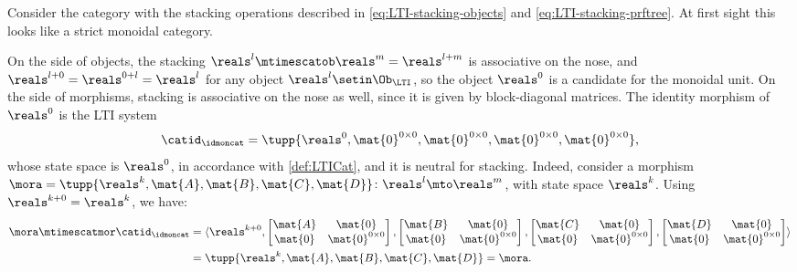 \begin{example}
    \label{exa:LTI-stacking-not-functorial}
    Consider the category \LTI with the stacking operations described in \cref{eq:LTI-stacking-objects} and \cref{eq:LTI-stacking-prftree}.
    At first sight this looks like a strict monoidal category.

    On the side of objects, the stacking $\reals^l \mtimescatob \reals^m = \reals^{l+m}$ is associative on the nose, and $\reals^{l+0}=\reals^{0+l}=\reals^l$ for any object $\reals^l\setin \Ob_\LTI$, so the object $\reals^0$ is a candidate for the monoidal unit.
    On the side of morphisms, stacking is associative on the nose as well, since it is given by block-diagonal matrices.
    The identity morphism of $\reals^0$ is the LTI system
    \begin{equation*}
        \catid_\idmoncat=\tupp{\reals^0, \mat{0}^{0\times 0}, \mat{0}^{0\times 0}, \mat{0}^{0\times 0},\mat{0}^{0\times 0}},
    \end{equation*}
    whose state space is $\reals^0$, in accordance with \cref{def:LTICat}, and it is neutral for stacking.
    Indeed, consider a morphism $\mora = \tupp{\reals^k, \mat{A}, \mat{B}, \mat{C}, \mat{D}} \colon \reals^l\mto \reals^m$, with state space $\reals^k$.
    Using $\reals^{k+0} = \reals^k$, we have:
    \begin{equation*}
        \begin{aligned}
            \mora \mtimescatmor \catid_\idmoncat & =
            \langle \reals^{k+0},
            \begin{bmatrix}\mat{A}&\mat{0}\\ \mat{0}&\mat{0}^{0\times 0}\end{bmatrix},
            \begin{bmatrix}\mat{B}&\mat{0}\\ \mat{0}&\mat{0}^{0\times 0}\end{bmatrix},
            \begin{bmatrix}\mat{C}&\mat{0}\\ \mat{0}&\mat{0}^{0\times 0}\end{bmatrix},
            \begin{bmatrix}\mat{D}&\mat{0}\\ \mat{0}&\mat{0}^{0\times 0}\end{bmatrix}\rangle \\
                                                 & =\tupp{\reals^k, \mat{A}, \mat{B}, \mat{C}, \mat{D}} = \mora.
        \end{aligned}

\end{equation*}
\end{example}
